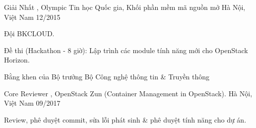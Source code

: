 
\begin{cvhonors}

  \cvhonor
    {Giải Nhất} %
    {, Olympic Tin học Quốc gia, Khối phần mềm mã nguồn mở} %
    {Hà Nội, Việt Nam} %
    {12/2015} %

  \cvhonor
 	{} %
	{Đội BKCLOUD.} %
    {} %
    {} %

  \cvhonor
 	{} %
	{Đề thi (Hackathon - 8 giờ): Lập trình các module tính năng mới cho OpenStack Horizon.} %
    {} %
    {} %

  \cvhonor
    {Bằng khen của Bộ trưởng Bộ Công nghệ thông tin \& Truyền thông} %
    {} %
    {} %
    {} %

  \cvhonor
    {Core Reviewer} %
    {, OpenStack Zun (Container Management in OpenStack).} %
    {Hà Nội, Việt Nam} %
    {09/2017} %

  \cvhonor
 	{} %
	{Review, phê duyệt commit, sửa lỗi phát sinh \& phê duyệt tính năng cho dự án.} %
    {} %
    {} %

\end{cvhonors}
